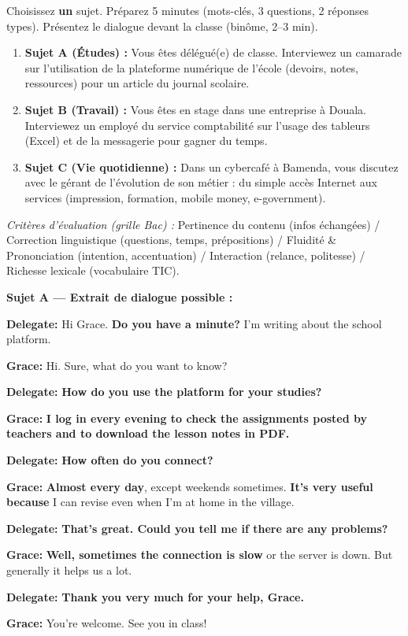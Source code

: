 \documentclass[11pt]{article}
\begin{document}
\begin{exercice}
Choisissez \textbf{un} sujet. Préparez 5 minutes (mots-clés, 3 questions, 2 réponses types). Présentez le dialogue devant la classe (binôme, 2--3 min).
\begin{enumerate}
\item \textbf{Sujet A (Études) :} Vous êtes délégué(e) de classe. Interviewez un camarade sur l'utilisation de la plateforme numérique de l'école (devoirs, notes, ressources) pour un article du journal scolaire.
\item \textbf{Sujet B (Travail) :} Vous êtes en stage dans une entreprise à Douala. Interviewez un employé du service comptabilité sur l'usage des tableurs (Excel) et de la messagerie pour gagner du temps.
\item \textbf{Sujet C (Vie quotidienne) :} Dans un cybercafé à Bamenda, vous discutez avec le gérant de l'évolution de son métier : du simple accès Internet aux services (impression, formation, mobile money, e-government).
\end{enumerate}
\emph{Critères d'évaluation (grille Bac) :} Pertinence du contenu (infos échangées) / Correction linguistique (questions, temps, prépositions) / Fluidité \& Prononciation (intention, accentuation) / Interaction (relance, politesse) / Richesse lexicale (vocabulaire TIC).
\end{exercice}

\begin{corrige}
\textbf{Sujet A — Extrait de dialogue possible :}

\textbf{Delegate:} Hi Grace. \textbf{Do you have a minute?} I'm writing about the school platform.

\textbf{Grace:} Hi. Sure, what do you want to know?

\textbf{Delegate:} \textbf{How do you use the platform for your studies?}

\textbf{Grace:} \textbf{I log in every evening to check the assignments posted by teachers and to download the lesson notes in PDF.}

\textbf{Delegate:} \textbf{How often do you connect?}

\textbf{Grace:} \textbf{Almost every day}, except weekends sometimes. \textbf{It's very useful because} I can revise even when I'm at home in the village.

\textbf{Delegate:} \textbf{That's great. Could you tell me if there are any problems?}

\textbf{Grace:} \textbf{Well, sometimes the connection is slow} or the server is down. But generally it helps us a lot.

\textbf{Delegate:} \textbf{Thank you very much for your help, Grace.}

\textbf{Grace:} You're welcome. See you in class!
\end{corrige}
\end{document}
